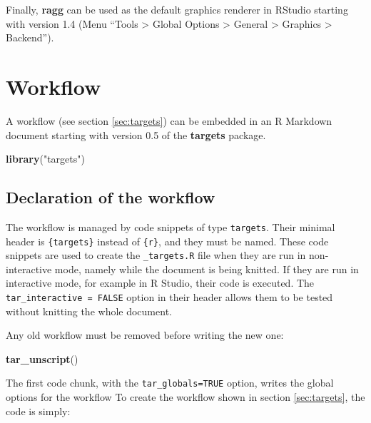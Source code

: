 \documentclass[
  12pt,
  american,
  a4paper,
  extrafontsizes,onecolumn,openright
  ]{memoir}
\newenvironment{Shaded}{\begin{snugshade}}{\end{snugshade}}
\newcommand{\FunctionTok}[1]{\textcolor[rgb]{0.13,0.29,0.53}{\textbf{#1}}}
\newcommand{\NormalTok}[1]{#1}
\newcommand{\StringTok}[1]{\textcolor[rgb]{0.31,0.60,0.02}{#1}}
\begin{document}
Finally, \textbf{ragg} can be used as the default graphics renderer in RStudio starting with version 1.4 (Menu \enquote{Tools \textgreater{} Global Options \textgreater{} General \textgreater{} Graphics \textgreater{} Backend}).

\section{Workflow}\label{sec:targetsmd}

A workflow (see section \ref{sec:targets}) can be embedded in an R Markdown document starting with version 0.5 of the \textbf{targets} package.

\scriptsize

\begin{Shaded}
\begin{Highlighting}[]
\FunctionTok{library}\NormalTok{(}\StringTok{"targets"}\NormalTok{)}
\end{Highlighting}
\end{Shaded}

\normalsize

\subsection{Declaration of the workflow}\label{declaration-of-the-workflow}

The workflow is managed by code snippets of type \texttt{targets}.
Their minimal header is \texttt{\{targets\}} instead of \texttt{\{r\}}, and they must be named.
These code snippets are used to create the \texttt{\_targets.R} file when they are run in non-interactive mode, namely while the document is being knitted.
If they are run in interactive mode, for example in R Studio, their code is executed.
The \texttt{tar\_interactive\ =\ FALSE} option in their header allows them to be tested without knitting the whole document.

Any old workflow must be removed before writing the new one:

\scriptsize

\begin{Shaded}
\begin{Highlighting}[]
\FunctionTok{tar\_unscript}\NormalTok{()}
\end{Highlighting}
\end{Shaded}

\normalsize

The first code chunk, with the \texttt{tar\_globals=TRUE} option, writes the global options for the workflow
To create the workflow shown in section \ref{sec:targets}, the code is simply:
\end{document}

